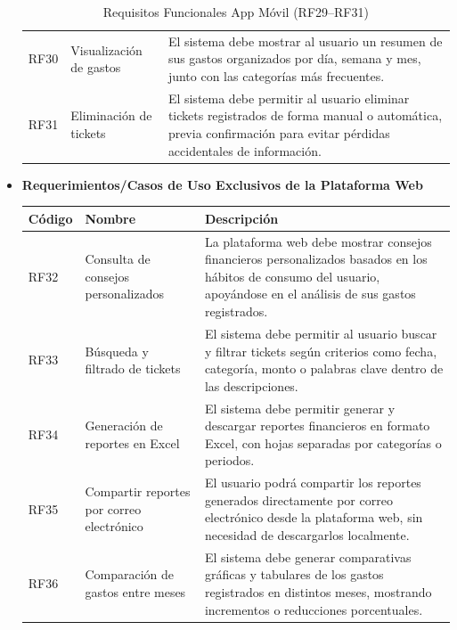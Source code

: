 \begin{itemize}
\begin{table}[H]
\begin{tabularx}{\textwidth}{@{} l l X @{}}
    RF30 & Visualización de gastos &
    El sistema debe mostrar al usuario un resumen de sus gastos organizados por día, semana y mes, junto con las categorías más frecuentes. \\

    RF31 & Eliminación de tickets &
    El sistema debe permitir al usuario eliminar tickets registrados de forma manual o automática, previa confirmación para evitar pérdidas accidentales de información. \\

    \bottomrule
    \end{tabularx}
    \caption{Requisitos Funcionales App Móvil (RF29–RF31)}
    \end{table}

    \item \textbf{Requerimientos/Casos de Uso Exclusivos de la Plataforma Web} 
    
    \begin{table}[H]
    \centering
    \renewcommand{\arraystretch}{1.2}
    \begin{tabularx}{\textwidth}{@{} l l X @{}}
    \toprule
    \textbf{Código} & \textbf{Nombre} & \textbf{Descripción} \\
    \midrule
RF32 & Consulta de consejos personalizados &
La plataforma web debe mostrar consejos financieros personalizados basados en los hábitos de consumo del usuario, apoyándose en el análisis de sus gastos registrados. \\

RF33 & Búsqueda y filtrado de tickets &
El sistema debe permitir al usuario buscar y filtrar tickets según criterios como fecha, categoría, monto o palabras clave dentro de las descripciones. \\

RF34 & Generación de reportes en Excel &
El sistema debe permitir generar y descargar reportes financieros en formato Excel, con hojas separadas por categorías o periodos. \\

RF35 & Compartir reportes por correo electrónico &
El usuario podrá compartir los reportes generados directamente por correo electrónico desde la plataforma web, sin necesidad de descargarlos localmente. \\

RF36 & Comparación de gastos entre meses &
El sistema debe generar comparativas gráficas y tabulares de los gastos registrados en distintos meses, mostrando incrementos o reducciones porcentuales. \\


\end{tabularx}
\end{table}
\end{itemize}
